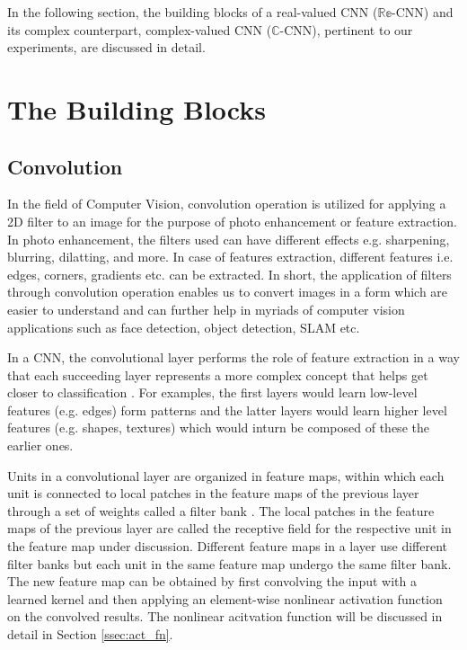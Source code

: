  In the following section, the building blocks of a real-valued CNN ($\mathbb{Re}$-CNN) and its complex counterpart, complex-valued CNN ($\mathbb{C}$-CNN), pertinent to our experiments, are discussed in detail.
 
 \section{The Building Blocks}
 
 
 
 \subsection{Convolution}
  In the field of Computer Vision, convolution operation is utilized for applying a 2D filter to an image for the purpose of photo enhancement or feature extraction. In photo enhancement, the filters used can have different effects e.g. sharpening, blurring, dilatting, and more. In case of features extraction, different features i.e. edges, corners, gradients etc. can be extracted. In short, the application of filters through convolution operation enables us to convert images in a form which are easier to understand and can further help in myriads of computer vision applications such as face detection, object detection, SLAM etc. 
  
  In a CNN, the convolutional layer performs the role of feature extraction in a way that each succeeding layer represents a more complex concept that helps get closer to classification \cite{nature}. For examples, the first layers would learn low-level features (e.g. edges) form patterns and the latter layers would learn higher level features (e.g. shapes, textures) which would inturn be composed of these the earlier ones. 

 
 Units in a convolutional layer are organized in feature maps, within which each unit is connected to local patches in the feature maps of the previous  layer through a set of weights called a filter bank \cite{nature}.  The local patches in the feature maps of the previous layer are called the receptive field for the respective unit in the feature map under discussion. Different feature maps in a layer use different filter banks but each unit in the same feature map undergo the same filter bank. The new feature map can be obtained by first convolving the input with a learned kernel and then applying an element-wise nonlinear activation function on the convolved results\cite{recent_advances}. The nonlinear acitvation function will be discussed in detail in Section \ref{ssec:act_fn}. 
 
